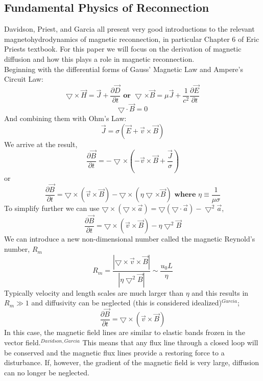 \documentclass{article}
\begin{document}
\subsection{Fundamental Physics of Reconnection}
Davidson, Priest, and Garcia all present very good introductions to the relevant magnetohydrodynamics of magnetic reconnection, in particular Chapter 6 of Eric Priests textbook.  For this paper we will focus on the derivation of magnetic diffusion and how this plays a role in magnetic reconnection.\\
Beginning with the differential forms of Gauss' Magnetic Law and Ampere's Circuit Law:
$$\bigtriangledown \times \vec{H}=\vec{J}+\frac{\partial \vec{D}}{\partial t} \textbf{ or } \bigtriangledown \times \vec{B}=\mu\vec{J}+\frac{1}{c^2}\frac{\partial \vec{E}}{\partial t}$$
$$\bigtriangledown \cdot \vec{B} = 0$$
And combining them with Ohm's Law:
$$\vec{J}=\sigma\left(\vec{E}+\vec{v}\times\vec{B}\right)$$
We arrive at the result,
$$\frac{\partial\vec{B}}{\partial t}=-\bigtriangledown\times\left(-\vec{v}\times\vec{B}+\frac{\vec{J}}{\sigma}\right)$$
or
$$\frac{\partial\vec{B}}{\partial t}=\bigtriangledown\times\left(\vec{v}\times\vec{B}\right)-\bigtriangledown\times\left(\eta\bigtriangledown\times\vec{B}\right) \textbf{ where }\eta\equiv\frac{1}{\mu\sigma}$$
To simplify further we can use $\bigtriangledown\times\left(\bigtriangledown\times\vec{a}\right)=\bigtriangledown\left(\bigtriangledown\cdot\vec{a}\right)-\bigtriangledown^2\vec{a}$,
$$\frac{\partial\vec{B}}{\partial t}=\bigtriangledown\times\left(\vec{v}\times\vec{B}\right)-\eta\bigtriangledown^2\vec{B}$$
We can introduce a new non-dimensional number called the magnetic Reynold's number, $R_m$
$$R_m=\frac{\left|\bigtriangledown\times\vec{v}\times\vec{B}\right|}{\left|\eta\bigtriangledown^2\vec{B}\right|}\sim\frac{u_0 L}{\eta}$$
Typically velocity and length scales are much larger than $\eta$ and this results in $R_m\gg1$ and diffusivity can be neglected (this is considered idealized)$^{Garcia}$;
$$\frac{\partial\vec{B}}{\partial t}=\bigtriangledown\times\left(\vec{v}\times\vec{B}\right)$$
In this case, the magnetic field lines are similar to elastic bands frozen in the vector field.$^{Davidson, Garcia}$  This means that any flux line through a closed loop will be conserved and the magnetic flux lines provide a restoring force to a disturbance.  If, however, the gradient of the magnetic field is very large, diffusion can no longer be neglected.\\\\
\end{document}

